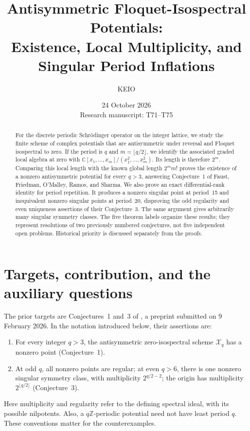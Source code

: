 \documentclass[11pt,a4paper]{article}
\title{Antisymmetric Floquet-Isospectral Potentials:\\
Existence, Local Multiplicity, and Singular Period Inflations}
\author{KEIO}
\date{24 October 2026\\[3pt]\small Research manuscript: T71--T75}
\theoremstyle{definition}
\theoremstyle{remark}
\newcommand{\C}{\mathbb C}
\newcommand{\Z}{\mathbb Z}
\newcommand{\X}{\mathcal X}
\begin{document}
\maketitle
\begin{abstract}
For the discrete periodic Schr\"odinger operator on the integer lattice, we study
the finite scheme of complex potentials that are antisymmetric under reversal
and Floquet isospectral to zero. If the period is $q$ and $m=\lfloor q/2\rfloor$,
we identify the associated graded local algebra at zero with
$\C[x_1,\ldots,x_m]/(x_1^2,\ldots,x_m^2)$.
Its length is therefore $2^m$. Comparing this local length with the known global
length $2^m m!$ proves the existence of a nonzero antisymmetric potential for
every $q>3$, answering Conjecture~1 of Faust, Friedman, O'Malley, Ramos, and
Sharma. We also prove an exact differential-rank identity for period repetition.
It produces a nonzero singular point at period~15 and inequivalent nonzero
singular points at period~20, disproving the odd regularity and even uniqueness
assertions of their Conjecture~3. The same argument gives arbitrarily many
singular symmetry classes. The five theorem labels organize these results;
they represent resolutions of two previously numbered conjectures, not five
independent open problems. Historical priority is discussed separately from
the proofs.
\end{abstract}

\section{Targets, contribution, and the auxiliary questions}

The prior targets are Conjectures~1 and~3 of \cite{FFORS}, a preprint submitted
on 9 February 2026. In the notation introduced below, their assertions are:
\begin{enumerate}[label=(\roman*)]
\item For every integer $q>3$, the antisymmetric zero-isospectral scheme
      $\X_q$ has a nonzero point (Conjecture~1).
\item At odd $q$, all nonzero points are regular; at even $q>6$, there is
      one nonzero singular symmetry class, with multiplicity $2^{q/2-2}$;
      the origin has multiplicity $2^{\lfloor q/2\rfloor}$ (Conjecture~3).
\end{enumerate}
Here multiplicity and regularity refer to the defining spectral ideal, with
its possible nilpotents. Also, a $q\Z$-periodic potential need not have least
period $q$. These conventions matter for the counterexamples.
\end{document}
